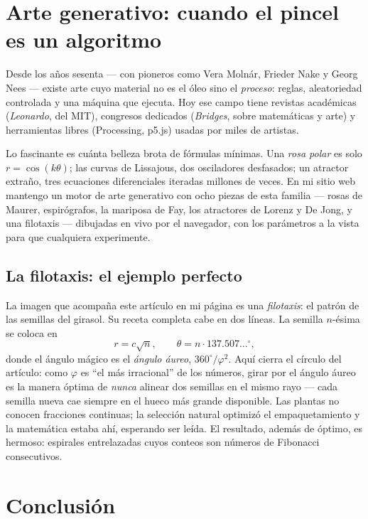 \documentclass[11pt]{article}
\begin{document}
\section{Arte generativo: cuando el pincel es un algoritmo}

Desde los años sesenta --- con pioneros como Vera Molnár, Frieder Nake y Georg Nees --- existe
arte cuyo material no es el óleo sino el \emph{proceso}: reglas, aleatoriedad controlada y una
máquina que ejecuta. Hoy ese campo tiene revistas académicas (\emph{Leonardo}, del MIT),
congresos dedicados (\emph{Bridges}, sobre matemáticas y arte) y herramientas libres
(Processing, p5.js) usadas por miles de artistas.

Lo fascinante es cuánta belleza brota de fórmulas mínimas. Una \emph{rosa polar} es solo
$r = \cos(k\theta)$; las curvas de Lissajous, dos osciladores desfasados; un atractor extraño,
tres ecuaciones diferenciales iteradas millones de veces. En mi sitio web mantengo un motor de
arte generativo con ocho piezas de esta familia --- rosas de Maurer, espirógrafos, la mariposa
de Fay, los atractores de Lorenz y De Jong, y una filotaxis --- dibujadas en vivo por el
navegador, con los parámetros a la vista para que cualquiera experimente.

\subsection{La filotaxis: el ejemplo perfecto}

La imagen que acompaña este artículo en mi página es una \emph{filotaxis}: el patrón de las
semillas del girasol. Su receta completa cabe en dos líneas. La semilla $n$-ésima se coloca en
\[
r = c\sqrt{n}, \qquad \theta = n \cdot 137.507\ldots^{\circ},
\]
donde el ángulo mágico es el \emph{ángulo áureo}, $360^{\circ}/\varphi^2$. Aquí cierra el
círculo del artículo: como $\varphi$ es ``el más irracional'' de los números, girar por el
ángulo áureo es la manera óptima de \emph{nunca} alinear dos semillas en el mismo rayo ---
cada semilla nueva cae siempre en el hueco más grande disponible. Las plantas no conocen
fracciones continuas; la selección natural optimizó el empaquetamiento y la matemática estaba
ahí, esperando ser leída. El resultado, además de óptimo, es hermoso: espirales entrelazadas
cuyos conteos son números de Fibonacci consecutivos.

\section{Conclusión}
\end{document}
